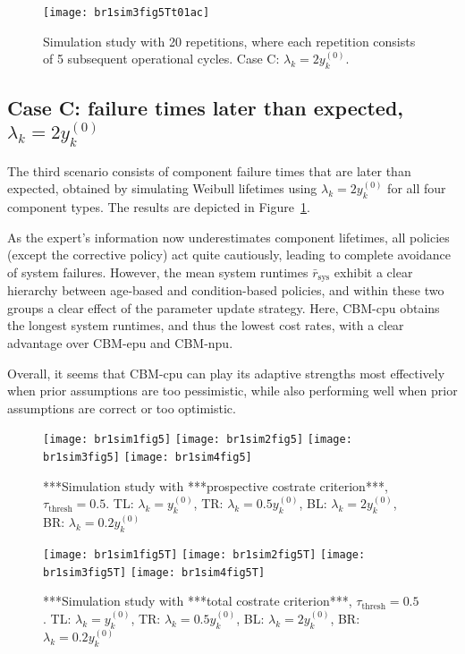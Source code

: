 \documentclass[authoryear]{elsarticle}
\newcommand{\uz}{^{(0)}} %
\def\ykz{y\uz_k}
\newcommand{\tthresh}{\tau_{\text{thresh}}}
\newcommand{\mrsys}{\bar{r}_\text{sys}}
\begin{document}
\begin{figure}
\texttt{[image: br1sim3fig5Tt01ac]}
\caption{Simulation study with 20 repetitions, where each repetition consists of 5 subsequent operational cycles.
Case C: $\lambda_k = 2\ykz$.}
\label{fig:br1sim3fig5Tt01}
\end{figure}

\subsection{Case C: failure times later than expected, $\lambda_k = 2 \ykz$}
\label{sec:case3}

The third scenario consists of component failure times that are later than expected,
obtained by simulating Weibull lifetimes using $\lambda_k = 2 \ykz$ for all four component types.
The results are depicted in Figure~\ref{fig:br1sim3fig5Tt01}.

As the expert's information now underestimates component lifetimes,
all policies (except the corrective policy) act quite cautiously,
leading to complete avoidance of system failures.
However, the mean system runtimes $\mrsys$ exhibit
a clear hierarchy between age-based and condition-based policies,
and within these two groups a clear effect of the parameter update strategy.
Here, CBM-cpu obtains the longest system runtimes, and thus the lowest cost rates,
with a clear advantage over CBM-epu and CBM-npu.

Overall, it seems that CBM-cpu can play its adaptive strengths most effectively
when prior assumptions are too pessimistic,
while also performing well when prior assumptions are correct or too optimistic.


\iffalse
\begin{figure}
\texttt{[image: br1sim1fig5]}
\texttt{[image: br1sim2fig5]}
\texttt{[image: br1sim3fig5]}
\texttt{[image: br1sim4fig5]}
\caption{***Simulation study with ***prospective costrate criterion***, $\tthresh = 0.5$.
TL: $\lambda_k =     \ykz$,
TR: $\lambda_k = 0.5 \ykz$,
BL: $\lambda_k = 2   \ykz$,
BR: $\lambda_k = 0.2 \ykz$}
\label{fig:simprospcostrate05}
\end{figure}

\begin{figure}
\texttt{[image: br1sim1fig5T]}
\texttt{[image: br1sim2fig5T]}
\texttt{[image: br1sim3fig5T]}
\texttt{[image: br1sim4fig5T]}
\caption{***Simulation study with ***total costrate criterion***, $\tthresh = 0.5$.
TL: $\lambda_k =     \ykz$,
TR: $\lambda_k = 0.5 \ykz$,
BL: $\lambda_k = 2   \ykz$,
BR: $\lambda_k = 0.2 \ykz$}
\label{fig:simtotalcostrate05}
\end{figure}
\end{document}
